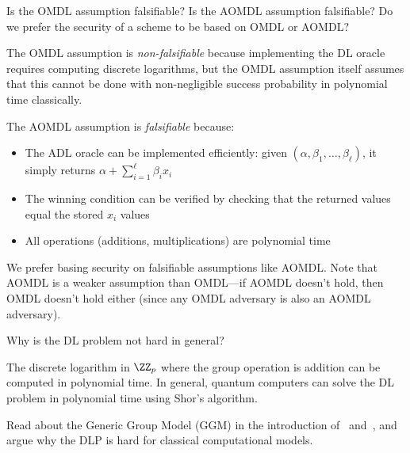 \begin{exercise}
  Is the OMDL assumption falsifiable? Is the AOMDL assumption falsifiable? Do we prefer the security of a scheme to be based on OMDL or AOMDL?
\end{exercise}

\ifsolutions
\begin{mysolution}
  The OMDL assumption is \emph{non-falsifiable} because implementing the DL oracle requires computing discrete logarithms, but the OMDL assumption itself assumes that this cannot be done with non-negligible success probability in polynomial time classically.

  The AOMDL assumption is \emph{falsifiable} because:
  \begin{itemize}
    \item The ADL oracle can be implemented efficiently: given $(\alpha, \beta_1, \ldots, \beta_\ell)$, it simply returns $\alpha + \sum_{i=1}^\ell \beta_i x_i$
    \item The winning condition can be verified by checking that the returned values equal the stored $x_i$ values
    \item All operations (additions, multiplications) are polynomial time
  \end{itemize}

  We prefer basing security on falsifiable assumptions like AOMDL. Note that AOMDL is a weaker assumption than OMDL---if AOMDL doesn't hold, then OMDL doesn't hold either (since any OMDL adversary is also an AOMDL adversary).
\end{mysolution}
\fi

\begin{exercise}[Optional]
  Why is the DL problem not hard in general?
\end{exercise}

\ifsolutions
\begin{mysolution}
  The discrete logarithm in $\ZZ_p$ where the group operation is addition can be computed in polynomial time.
  In general, quantum computers can solve the DL problem in polynomial time using Shor's algorithm.
\end{mysolution}
\fi

\begin{exercise}[Optional]
  Read about the Generic Group Model (GGM) in the introduction of~\cite{EC:Shoup97} and~\cite{IMA:Maurer05}, and argue why the DLP is hard for classical computational models.
\end{exercise}

